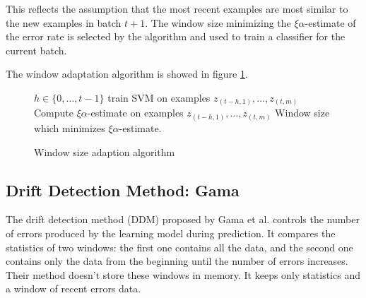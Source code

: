 
This reflects the assumption that the most recent examples are most similar 
to the new examples in batch $t+1$. The window size minimizing the $\xi \alpha$-estimate of the error rate is selected by the algorithm and used to train a classifier for the current batch.

The window adaptation algorithm is showed in figure \ref{Fig:SVM}.
\begin{figure}[h]
\begin{codebox}
\li \For $h \in \{0,\ldots, t-1\}$
\li \Do  train SVM on examples $z_{(t-h,1)}, \ldots, z_{(t,m)}$
\li  Compute $\xi \alpha$-estimate on examples $z_{(t-h,1)}, \ldots, z_{(t,m)}$
\End  
\li \Return Window size which minimizes $\xi \alpha$-estimate.
\end{codebox}

\caption{Window size adaption algorithm}
\label{Fig:SVM}
\end{figure}
\ENDOMIT
\BEGINOMIT
\subsection{Drift Detection Method: Gama}
\label{DDM}
The drift detection method (DDM) proposed by Gama et al.  \cite{Gama} controls the number of errors produced by
the learning model during prediction. %
It compares the statistics of two windows: the first one contains all the data, and the second one contains only the data from the beginning until the number of errors increases. Their method doesn't store these windows in memory. It keeps only statistics and a window of recent errors data.%

